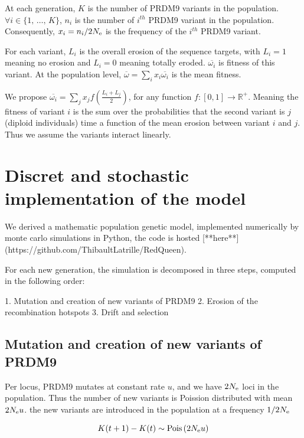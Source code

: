 \documentclass{article}
\begin{document}
At each generation, $K$ is the number of PRDM9 variants in the population. $\forall i \in \{ 1, \, \dots, \, K \}$, $n_i$ is the number of $i^{th}$ PRDM9 variant in the population. Consequently, $x_i = n_i / 2 N_\mathrm{e}$ is the frequency of the $i^{th}$ PRDM9 variant.


For each variant, $L_i$ is the overall erosion of the sequence targets, with $L_i=1$ meaning no erosion and $L_i=0$ meaning totally eroded. $\overline{\omega_i}$ is fitness of this variant. At the population level, $\overline{\omega}=\sum_{i} x_i \overline{\omega_i}$ is the mean fitness.

We propose $\overline{\omega_i}=\sum_j x_j f \left( \tfrac{L_i + L_j}{2} \right)$, for any function $f\colon [0,1] \rightarrow \mathbb{R}^+$. Meaning the fitness of variant $i$ is the sum over the probabilities that the second variant is $j$ (diploid individuals) time a function of the mean erosion between variant $i$ and $j$. Thus we assume the variants interact linearly.


\section{Discret and stochastic implementation of the model} 

We derived a mathematic population genetic model, implemented numerically by monte carlo simulations in Python, the code is hosted [**here**](https://github.com/ThibaultLatrille/RedQueen).

For each new generation, the simulation is decomposed in three steps, computed in the following order: 

1. Mutation and creation of new variants of PRDM9
2. Erosion of the recombination hotspots
3. Drift and selection

\subsection{Mutation and creation of new variants of PRDM9} 

Per locus, PRDM9 mutates at constant rate $u$, and we have $2 N_\mathrm{e}$ loci in the population. Thus the number of new variants is Poission distributed with mean $2 N_\mathrm{e} u$. the new variants are introduced in the population at a frequency $1 / 2 N_\mathrm{e}$

\begin{equation}
  K(t+1) - K(t) \sim \operatorname{Pois} \left(2 N_\mathrm{e} u \right)
\end{equation}
\end{document}
